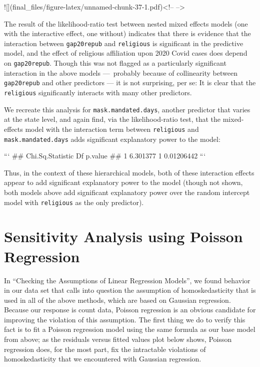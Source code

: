 \documentclass[
]{article}
\begin{document}
\begin{center}
![](final_files/figure-latex/unnamed-chunk-37-1.pdf)<!-- --> 
\end{center}

The result of the likelihood-ratio test between nested mixed effects
models (one with the interactive effect, one without) indicates that
there is evidence that the interaction between \texttt{gap20repub} and
\texttt{religious} is significant in the predictive model, and the
effect of religious affiliation upon 2020 Covid cases does depend on
\texttt{gap20repub}. Though this was not flagged as a particularly
significant interaction in the above models ---~probably because of
collinearity between \texttt{gap20repub} and other predictors --- it is
not surprising, per se: It is clear that the \texttt{religious}
significantly interacts with many other predictors.

We recreate this analysis for \texttt{mask.mandated.days}, another
predictor that varies at the state level, and again find, via the
likelihood-ratio test, that the mixed-effects model with the interaction
term between \texttt{religious} and \texttt{mask.mandated.days} adds
significant explanatory power to the model:

\begin{center}

```
##   Chi.Sq.Statistic Df    p.value
## 1         6.301377  1 0.01206442
```
\end{center}

Thus, in the context of these hierarchical models, both of these
interaction effects appear to add significant explanatory power to the
model (though not shown, both models above add significant explanatory
power over the random intercept model with \texttt{religious} as the
only predictor).

\hypertarget{sensitivity-analysis-using-poisson-regression}{%
\section{Sensitivity Analysis using Poisson
Regression}\label{sensitivity-analysis-using-poisson-regression}}

In ``Checking the Assumptions of Linear Regression Models'', we found
behavior in our data set that calls into question the assumption of
homoskedasticity that is used in all of the above methods, which are
based on Gaussian regression. Because our response is count data,
Poisson regression is an obvious candidate for improving the violation
of this assumption. The first thing we do to verify this fact is to fit
a Poisson regression model using the same formula as our base model from
above; as the residuals versus fitted values plot below shows, Poisson
regression does, for the most part, fix the intractable violations of
homoskedasticity that we encountered with Gaussian regression.
\end{document}
